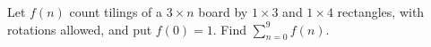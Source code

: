 Let $ f(n)$ count tilings of a $ 3\times n $ board by $ 1\times3 $ and $ 1\times4 $ rectangles, with rotations allowed, and put $ f(0)=1 $. Find $\sum_{n=0}^9f(n)$.

